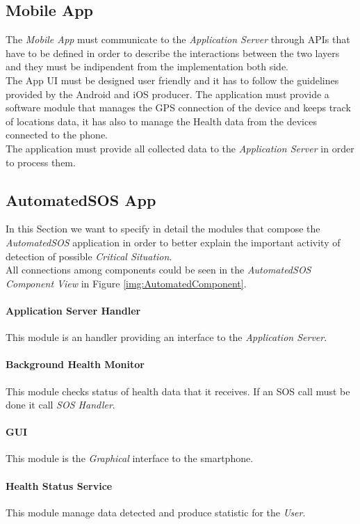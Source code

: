 \subsection{Mobile App}
The \textit{Mobile App} must communicate to the \textit{Application Server} through APIs that have to be defined in order to describe the interactions between the two layers and they must be indipendent from the implementation both side.\\
The App UI must be designed user friendly and it has to follow the guidelines provided by the Android and iOS producer.
The application must provide a software module that manages the GPS connection of the device and keeps track of locations data, it has also to manage the Health data from the devices connected to the phone.\\
The application must provide all collected data to the \textit{Application Server} in order to process them.

\subsection{AutomatedSOS App}
In this Section we want to specify in detail the modules that compose the \textit{AutomatedSOS} application in order to better explain the important activity of detection of possible \textit{Critical Situation}.\\
All connections among components could be seen in the \textit{AutomatedSOS Component View} in Figure \ref{img:AutomatedComponent}.

\paragraph{Application Server Handler}
This module is an handler providing an interface to the \textit{Application Server}.

\paragraph{Background Health Monitor}
This module checks status of health data that it receives. If an SOS call must be done it call \textit{SOS Handler}.

\paragraph{GUI}
This module is the \textit{Graphical} interface to the smartphone.

\paragraph{Health Status Service}
This module manage data detected and produce statistic for the \textit{User}.


